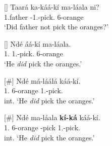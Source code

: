 \documentclass[output=paper,colorlinks,citecolor=brown,
]{langscibook}
\begin{document}
\begin{exe}
     \ex \label{58}
    \begin{xlist}
\ex
[]{
\label{58a}
\gll
Taará ka-káá-kí ma-láala ni?\\
1.father \Neg{}-1\Sm{}.\Pst{}-pick.\Pst{} 6-orange \Neg{}\\
\trans ‘Did father not pick the oranges?’
}

\ex
[]{
\label{58b}
\gll
Ndé áá-kí ma-láala.\\
1.\Pro{} 1\Sm{}.\Pst{}-pick.\Pst{} 6-orange\\
\trans ‘He \textit{did} pick the oranges.’
}

\ex
[\#]{
\label{58c}
\gll
Ndé má-láálá káá-kí.\\
1.\Pro{} 6-orange 1\Sm{}.\Pst{}-pick.\Pst{}\\
\trans int. ‘He \textit{did} pick the oranges.’
}

\ex
[\#]{
\label{58d}
\gll
Ndé ma-láala \textbf{kí-ká} káá-kí.\\
1.\Pro{} 6-orange \Inf{}-pick 1\Sm{}.\Pst{}-pick.\Pst{}\\
\trans int. ‘He \textit{did} pick the oranges.’
}

    \end{xlist}
\end{exe}
\end{document}
